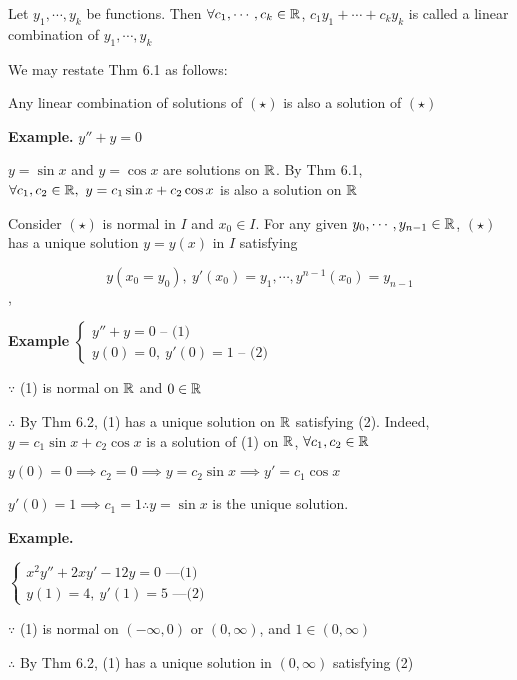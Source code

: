 \begin{defn}
	Let $y_1,\cdots,y_k$ be functions. Then $\forall c_1,\cdots,c_k \in \mathbb{R}$, $c_1y_1 + \cdots + c_ky_k$ is called a linear combination of $y_1,\cdots,y_k$
\end{defn}

\begin{rmk*}
	We may restate Thm 6.1 as follows:
	
	Any linear combination of solutions of $(\star)$ is also a solution of $(\star)$
\end{rmk*}

\textbf{Example. } $y'' + y = 0$

$y = \sin x$ and $y = \cos x$ are solutions on $\mathbb{R}$. By Thm 6.1, $\forall c_1,c_2 \in \mathbb{R},~ y = c_1\sin x + c_2 \cos x$ is also a solution on $\mathbb{R}$

\begin{thm*}
	Consider $(\star)$ is normal in $I$ and $x_0 \in I$. For any given $y_0,\cdots,y_{n-1} \in \mathbb{R}$, $(\star)$ has a unique solution $y = y(x)$ in $I$ satisfying
	
	$$y(x_0 = y_0),~y'(x_0) = y_1,\cdots,y^{n-1}(x_0) = y_{n-1}$$,
\end{thm*}

\textbf{Example} $\begin{cases}
	y'' + y = 0 \text{ -- (1)}\\
	y(0) = 0,~y'(0) = 1 \text{ -- (2)}
\end{cases}$

$\because$ (1) is normal on $\mathbb{R}$ and $0 \in \mathbb{R}$

$\therefore$ By Thm 6.2, (1) has a unique solution on $\mathbb{R}$ satisfying (2). Indeed, $y = c_1\sin x + c_2 \cos x$ is a solution of (1) on $\mathbb{R}$, $\forall c_1,c_2 \in \mathbb{R}$

$y(0) = 0 \implies c_2 = 0 \implies y = c_2 \sin x \implies y' = c_1 \cos x$

$y'(0) = 1 \implies c_1 = 1 \therefore y = \sin x$ is the unique solution.

\textbf{Example.}

$\begin{cases}
	x^2y'' + 2xy' - 12y = 0 \text{ ---(1)}\\
	y(1) = 4,~y'(1) = 5 \text{ ---(2)}
\end{cases}$

$\because$ (1) is normal on $(-\infty,0)$ or $(0,\infty)$, and $1 \in (0,\infty)$

$\therefore$ By Thm 6.2, (1) has a unique solution in $(0,\infty)$ satisfying (2)

